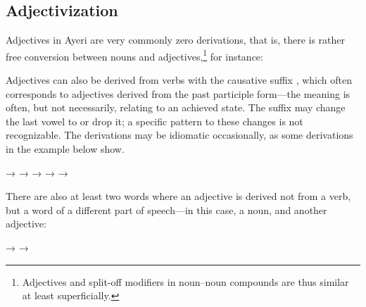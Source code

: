 \subsection{Adjectivization}

Adjectives in Ayeri are very commonly zero derivations, that is, 
there is rather free conversion between nouns and 
adjectives,\footnote{Adjectives and split-off modifiers in noun--noun compounds 
are thus similar at least superficially.} for instance:

\pex
	\a {}
		\til{} 
	\a {}
		\til{} 
	\a {}
		\til{} 
	\a {}
		\til{} 
	\a {}
		\til{} 
\xe

Adjectives can also be derived from verbs with the causative suffix 
, which often corresponds to adjectives derived from the 
past participle form---the meaning is often, but not necessarily, relating to 
an achieved state. The suffix may change the last vowel to  or drop 
it; a specific pattern to these changes is not recognizable. The derivations 
may be idiomatic occasionally, as some derivations in the example below show.

\pex
	\a {}
		→ 
	\a {}
		→ 
	\a {}
		→ 
	\a {}
		→ 
	\a {}
		→ 
\xe

There are also at least two words where an  adjective is 
derived not from a verb, but a word of a different part of speech---in this 
case, a noun, and another adjective:

\pex
	\a {}
		→ 
	\a {}
		→ 
\xe

